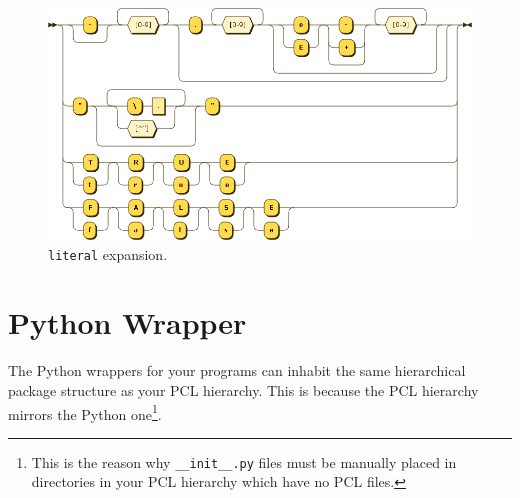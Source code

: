 \begin{figure}[h!]
  \centering
    \includegraphics[scale=\DiagramScale,angle=90]{chapters/adapter/diagrams/literal}
  \caption{\texttt{literal} expansion.}
  \label{fig:imperative-pcl-literal}
\end{figure}

\clearpage

\section{Python Wrapper}
The Python wrappers for your programs can inhabit the same hierarchical package structure as your PCL hierarchy. This is because the PCL hierarchy mirrors the Python one\footnote{This is the reason why \texttt{\_\_init\_\_.py} files must be manually placed in directories in your PCL hierarchy which have no PCL files.}.

